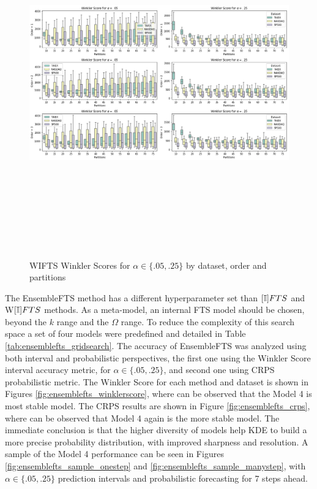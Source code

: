\begin{figure}[htb]
    \centering
    \includegraphics[width=\textwidth,height=15cm]{figures/wifts_gridsearch.png}
    \caption{WIFTS Winkler Scores for $\alpha \in \{.05, .25\}$ by dataset, order and partitions}
    \label{fig:wifts_gridsearch}
\end{figure}



The EnsembleFTS method has a different hyperparameter set than $[\mathbb{I}]FTS$ and W$[\mathbb{I}]FTS$ methods. As a meta-model, an internal FTS model should be chosen, beyond the $k$ range and the $\Omega$ range. To reduce the complexity of this search space a set of four models were predefined and detailed in Table \ref{tab:ensemblefts_gridsearch}. The accuracy of EnsembleFTS was analyzed using both interval and probabilistic perspectives, the first one using the Winkler Score interval accuracy metric, for  $\alpha \in \{.05, .25\}$, and second one using CRPS probabilistic metric. The Winkler Score for each method and dataset is shown in Figures \ref{fig:ensemblefts_winklerscore}, where can be observed that the Model 4 is most stable model. The CRPS results are shown in Figure  \ref{fig:ensemblefts_crps}, where  can be observed that Model 4 again is the more stable model. The immediate conclusion is that the higher diversity of models help KDE to build a more precise probability distribution, with improved sharpness and resolution.  A sample of the Model 4 performance can be seen in Figures \ref{fig:ensemblefts_sample_onestep} and \ref{fig:ensemblefts_sample_manystep}, with $\alpha \in \{.05, .25\}$ prediction intervals and probabilistic forecasting for 7 steps ahead.  


